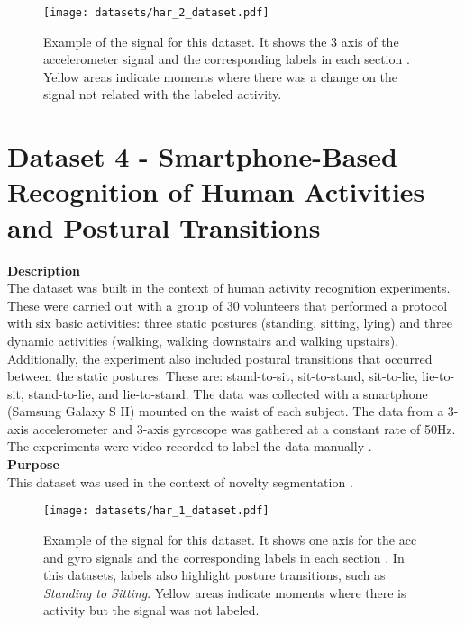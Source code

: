 \begin{figure}
\centering
\texttt{[image: datasets/har\_2\_dataset.pdf]}
\caption{Example of the signal for this dataset. It shows the 3 axis of the accelerometer signal and the corresponding labels in each section \cite{dataset2, dataset2_2}. Yellow areas indicate moments where there was a change on the signal not related with the labeled activity.}
\label{fig:har2_dataset}
\end{figure}
    
\section{Dataset 4 - Smartphone-Based Recognition of Human Activities and Postural Transitions}
\label{dat:dataset4}
\textbf{Description}\hfill\\
The dataset was built in the context of human activity recognition experiments. These were carried out with a group of 30 volunteers that performed a protocol with six basic activities: three static postures (standing, sitting, lying) and three dynamic activities (walking, walking downstairs and walking upstairs). Additionally, the experiment also included postural transitions that occurred between the static postures. These are: stand-to-sit, sit-to-stand, sit-to-lie, lie-to-sit, stand-to-lie, and lie-to-stand. The data was collected with a smartphone (Samsung Galaxy S II) mounted on the waist of each subject. The data from a 3-axis accelerometer and 3-axis gyroscope was gathered at a constant rate of 50Hz. The experiments were video-recorded to label the data manually \cite{dataset3}.\\
\textbf{Purpose}\hfill\\
This dataset was used in the context of novelty segmentation \cite{dataset3}.

\begin{figure}
\centering
\texttt{[image: datasets/har\_1\_dataset.pdf]}
\caption{Example of the signal for this dataset. It shows one axis for the \gls{acc} and \gls{gyro} signals and the corresponding labels in each section \cite{dataset3}. In this datasets, labels also highlight posture transitions, such as \textit{Standing to Sitting}. Yellow areas indicate moments where there is activity but the signal was not labeled.}
\label{fig:har1_dataset}
\end{figure}    
    
